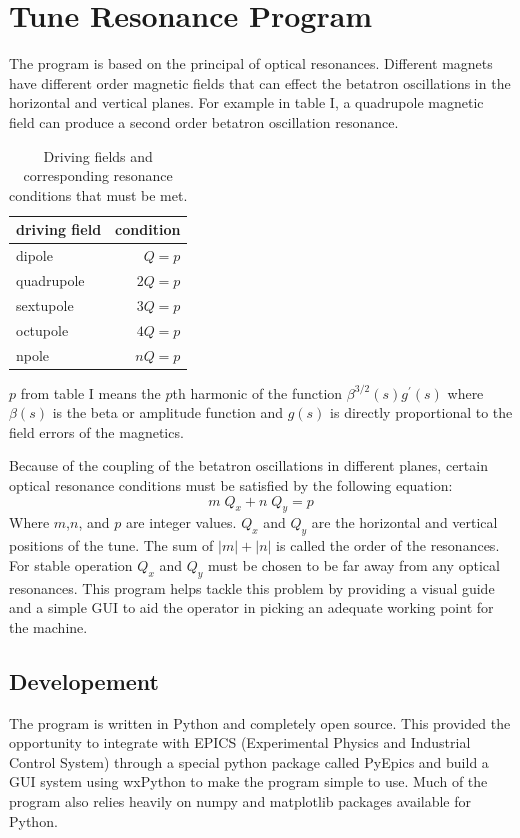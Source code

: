\documentclass[%
 reprint,%
 amssymb, amsmath,%
 aip,cha,%
]{revtex4-1}
\begin{document}
\section{Tune Resonance Program\cite{Note1}}

The program is based on the principal of optical resonances. Different magnets have different order magnetic fields that can effect the betatron oscillations in the horizontal and vertical planes. For example in table I, a quadrupole magnetic field can produce a second order betatron oscillation resonance. 
\begin{table}[h]
\centering
\begin{tabular}{l|r}
driving field & condition \\
\hline
\hline
dipole & $Q = p$ \\
quadrupole & $2Q = p$ \\
sextupole & $3Q = p$ \\
octupole & $4Q = p$ \\
npole & $nQ = p$\\
\end{tabular}
\caption{\label{tunetable}Driving fields and corresponding resonance conditions that must be met.}
\end{table}
$p$ from table I means the $p$th harmonic of the function $ \beta^{3/2} (s) g^\prime (s) $ where $ \beta (s)$ is the beta or amplitude function and $g (s)$ is directly proportional to the field errors of the magnetics.

Because of the coupling of the betatron oscillations in different planes, certain optical resonance conditions must be satisfied by the following equation:
\begin{equation}
 m \; Q_x + n \; Q_y = p
\end{equation}
Where $m$,$n$, and $p$ are integer values. $Q_x$ and $Q_y$ are the horizontal and vertical positions of the tune. The sum of $ |m| + |n| $ is called the order of the resonances. For stable operation $Q_x$ and $Q_y$ must be chosen to be far away from any optical resonances. This program helps tackle this problem by providing a visual guide and a simple GUI to aid the operator in picking an adequate working point for the machine.
\subsection{Developement}
The program is written in Python and completely open source. This provided the opportunity to integrate with EPICS (Experimental Physics and Industrial Control System) through a special python package called PyEpics and build a GUI system using wxPython to make the program simple to use. Much of the program also relies heavily on numpy and matplotlib packages available for Python.
\end{document}

